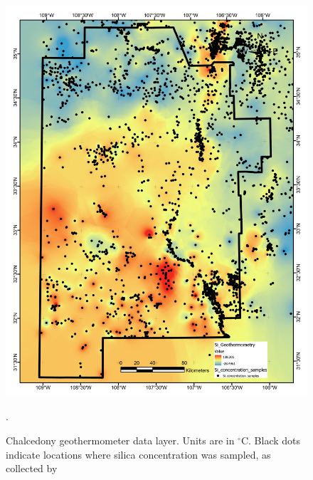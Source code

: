 \begin{figure}[!htp]
\centering
\includegraphics[scale=.50]{templates/images/Figure-SiTemp.pdf}
\caption[Silica geothermometer temperature data layer]{Chalcedony geothermometer data layer. Units are in $^\circ$C. Black dots indicate locations where silica concentration was sampled, as collected by \protect\citet{bielicki_hydrogeolgic_2015}}.
\label{fig:feat_si_temp}
\end{figure}

